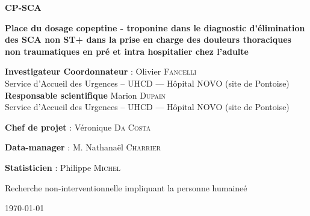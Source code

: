 %
\raggedright
\thispagestyle{empty}

\begin{tcolorbox}[colback=novo!5,
                  colframe=novo]
\begin{center}
\textbf{\textcolor{novo}{\Huge CP-SCA}}
\end{center}
\end{tcolorbox}


\bigskip
\begin{center}
\textbf{\Large Place du dosage copeptine - troponine dans le diagnostic d’élimination des SCA non ST+ dans la prise en charge des douleurs thoraciques non traumatiques en pré et intra hospitalier chez l’adulte}
\end{center}




\begin{center}
\begin{minipage}{0.8\textwidth}
\begin{tcolorbox}[colback=novo!5,
                  colframe=novo]
\textbf{Investigateur Coordonnateur} :   \doc Olivier \textsc{Fancelli}\\ Service d’Accueil des Urgences – UHCD --- Hôpital NOVO (site de Pontoise)\\

\textbf{Responsable scientifique} \mme Marion \textsc{Dupain}\\ Service d’Accueil des Urgences – UHCD --- Hôpital NOVO (site de Pontoise)\\


\bigskip

\textbf{Chef de projet} : \mme Véronique \textsc{Da Costa}
\bigskip

\textbf{Data-manager} : M. Nathanaël \textsc{Charrier}
\bigskip

\textbf{Statisticien} : \doc Philippe \textsc{Michel}

\end{tcolorbox}
\end{minipage}
\end{center}



Recherche non-interventionnelle impliquant la personne humaineé


\begin{flushright}
\today
\end{flushright}
